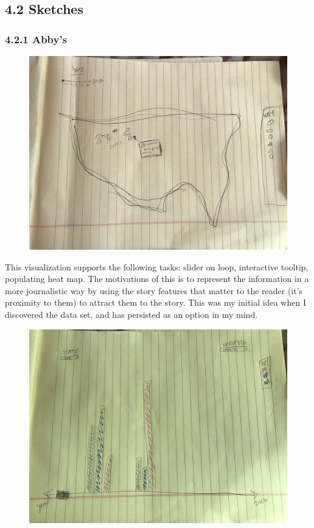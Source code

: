 \documentclass{neu_handout}
\begin{document}
\subsection*{4.2 Sketches}

\subsubsection*{4.2.1 Abby's}

\begin{figure}[h]
\centering
{
\includegraphics[width=0.9\linewidth]{abby1}
}
\end{figure}

This visualization supports the following tasks: slider on loop, interactive tooltip, populating heat map. The motivations of this is to represent the information in a more journalistic way by using the story features that matter to the reader (it's proximity to them) to attract them to the story. This was my initial idea when I discovered the data set, and has persisted as an option in my mind. 

\newpage

\begin{figure}[h]
\centering
{
\includegraphics[width=0.9\linewidth]{abby2}
}
\end{figure}
\end{document}
